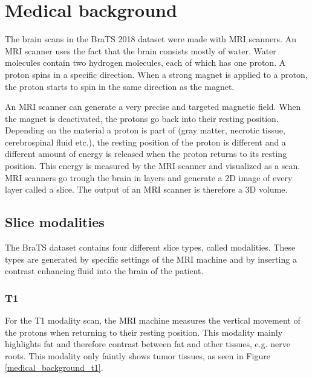 \section{Medical background}
The brain scans in the BraTS\cite{menze2015multimodal} 2018 dataset were made with MRI scanners\cite{mriscanner}. 
An MRI scanner uses the fact that the brain consists mostly of water. Water molecules contain two hydrogen molecules,
each of which has one proton. A proton spins in a specific direction. When a strong magnet is applied to a proton, the proton starts to spin in the same direction as the magnet. 

An MRI scanner can generate a very precise and targeted magnetic field. When the magnet is deactivated, the protons go back into their resting position. Depending on the material a proton is part of (gray matter, necrotic tissue, cerebrospinal fluid  etc.), the resting position of the proton is different and a different amount of energy is released when the proton returns to its resting position. This energy is measured by the MRI scanner and visualized as a scan. MRI scanners go trough the brain in layers and generate a 2D image of every layer called a slice. The output of an MRI scanner is therefore a 3D volume.

\subsection{Slice modalities}
The BraTS dataset contains four different slice types, called modalities. These types are generated by specific settings of the MRI machine and by inserting a contrast enhancing fluid into the brain of the patient.

\subsubsection{T1}
For the T1 modality scan, the MRI machine measures the vertical movement of the protons when returning to their resting position. This modality mainly highlights fat and therefore contrast between fat and other tissues, e.g. nerve roots\cite{mriquora}. This modality only faintly shows tumor tissues, as seen in Figure \ref{medical_background_t1}.


